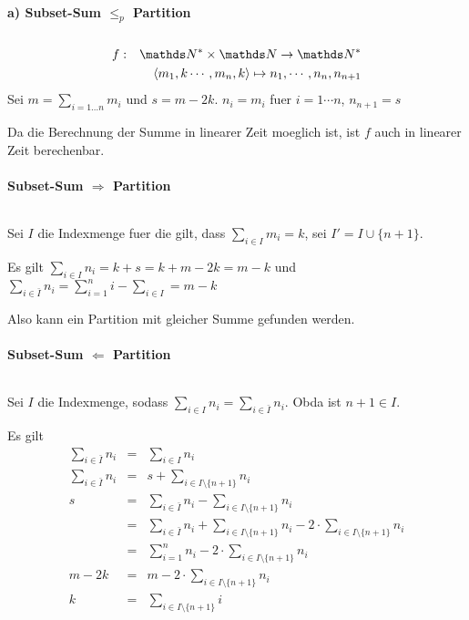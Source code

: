 \paragraph{a) Subset-Sum $\leq_p$ Partition} $ $
\begin{eqnarray}
f &:& \N^* \times \N \to \N^*\\
  & & \langle m_1,k \cdots, m_n, k \rangle \mapsto n_1, \cdots, n_n, n_{n+1}
\end{eqnarray}
Sei $m = \sum_{i= 1\ldots n} m_i$ und $s = m-2k$. 
$n_i = m_i$ fuer $i=1\cdots n$, $n_{n+1} = s$

Da die Berechnung der Summe in linearer Zeit moeglich ist, ist $f$ auch in linearer Zeit berechenbar.


\paragraph{Subset-Sum $\Rightarrow$ Partition} $ $

Sei $I$ die Indexmenge fuer die gilt, dass $\sum_{i\in I} m_i = k$,
sei $I' = I \cup \{n+1\}$.

Es gilt $\sum_{i\in I} n_i = k + s = k+m-2k = m-k$ und $\sum_{i\in \bar{I}} n_i = \sum_{i=1}^{n} i - \sum_{i\in I} = m-k$

Also kann ein Partition mit gleicher Summe gefunden werden.


\paragraph{Subset-Sum $\Leftarrow$ Partition} $ $

Sei $I$ die Indexmenge, sodass $\sum_{i\in I} n_i = \sum_{i\in\bar{I}} n_i$.
Obda ist $n+1 \in I$.

Es gilt 
\begin{eqnarray}
\sum_{i\in \bar{I}} n_i &=& \sum_{i\in I} n_i \\
\sum_{i\in \bar{I}} n_i &=&  s + \sum_{i\in I \setminus \{n+1\}} n_i \\
 s &=& \sum_{i\in \bar{I}} n_i - \sum_{i \in I \setminus \{n+1\}} n_i \\
   &=& \sum_{i\in \bar{I}} n_i + \sum_{i \in I \setminus \{n+1\}} n_i - 2 \cdot  \sum_{i \in I \setminus \{n+1\}} n_i \\
   &=& \sum_{i=1}^n n_i - 2 \cdot \sum_{i\in I \setminus \{n+1\}} n_i \\ 
 m-2k &=& m - 2 \cdot \sum_{i\in I \setminus \{n+1\}} n_i \\ 
 k &=& \sum_{i\in I\setminus \{n+1\}} i \\
\end{eqnarray}

